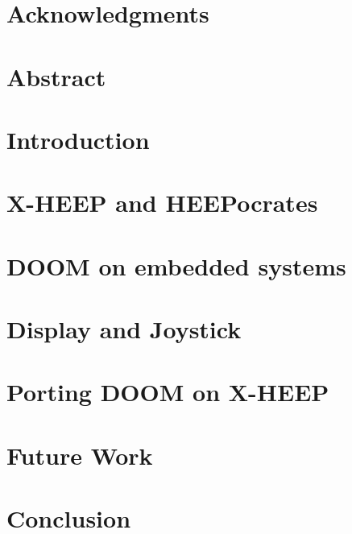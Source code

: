 \documentclass[12pt,twoside]{report}
\begin{document}



\chapter*{Acknowledgments}


\chapter*{Abstract}


\tableofcontents

\chapter{Introduction}


\chapter{X-HEEP and HEEPocrates}


\chapter{DOOM on embedded systems}


\chapter{Display and Joystick}
 

\chapter{Porting DOOM on X-HEEP}


\chapter{Future Work}


\chapter{Conclusion}


\printbibliography
\end{document}
